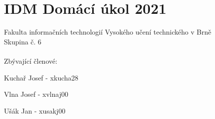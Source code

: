 
\section*{IDM Domácí úkol 2021}
Fakulta informačních technologií Vysokého učení technického v Brně \\
Skupina č. 6 \\\\
Zbývající členové:

Kuchař Josef - xkucha28

Vlna Josef - xvlnaj00

Ušák Jan - xusakj00
